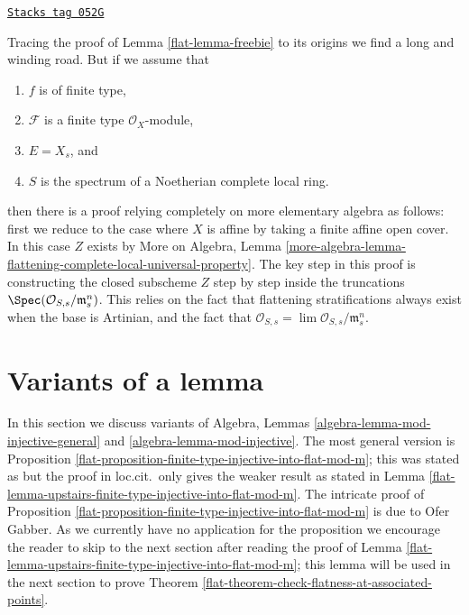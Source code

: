 \begin{remark}
\label{flat-remark-flattening-complete-noetherian}
\href{https://stacks.math.columbia.edu/tag/052G}{\texttt{Stacks tag 052G}}

Tracing the proof of
Lemma \ref{flat-lemma-freebie}
to its origins we find a long and winding road. But if we assume that
\begin{enumerate}
\item $f$ is of finite type,
\item $\mathcal{F}$ is a finite type $\mathcal{O}_X$-module,
\item $E = X_s$, and
\item $S$ is the spectrum of a Noetherian complete local ring.
\end{enumerate}
then there is a proof relying completely on more elementary algebra as
follows: first we reduce to the case where $X$ is affine by taking
a finite affine open cover. In this case $Z$ exists by
More on Algebra,
Lemma \ref{more-algebra-lemma-flattening-complete-local-universal-property}.
The key step in this proof is constructing the closed subscheme $Z$
step by step inside the truncations
$\Spec(\mathcal{O}_{S, s}/\mathfrak m_s^n)$.
This relies on the fact that flattening stratifications always exist
when the base is Artinian, and the fact that
$\mathcal{O}_{S, s} = \lim \mathcal{O}_{S, s}/\mathfrak m_s^n$.
\end{remark}

\section{Variants of a lemma}
\label{flat-section-variants-mod-injective}
In this section we discuss variants of
Algebra, Lemmas \ref{algebra-lemma-mod-injective-general} and
\ref{algebra-lemma-mod-injective}.
The most general version is
Proposition \ref{flat-proposition-finite-type-injective-into-flat-mod-m};
this was stated as \cite[Lemma 4.2.2]{GruRay} but the proof in
loc.cit.\ only gives the weaker result as stated in
Lemma \ref{flat-lemma-upstairs-finite-type-injective-into-flat-mod-m}.
The intricate proof of
Proposition \ref{flat-proposition-finite-type-injective-into-flat-mod-m}
is due to Ofer Gabber. As we currently have no application for
the proposition we encourage the reader to skip to the next section
after reading the proof of
Lemma \ref{flat-lemma-upstairs-finite-type-injective-into-flat-mod-m};
this lemma will be used in the next section to prove
Theorem \ref{flat-theorem-check-flatness-at-associated-points}.

